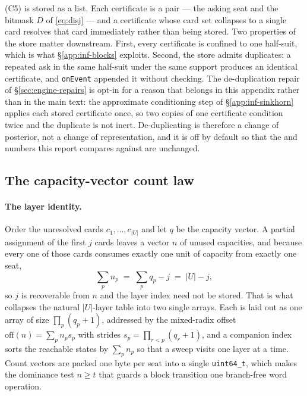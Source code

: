 (C5) is stored as a list. Each certificate is a pair --- the asking seat and the
bitmask $D$ of \eqref{eq:disj} --- and a certificate whose card set collapses to
a single card resolves that card immediately rather than being stored. Two
properties of the store matter downstream. First, every certificate is confined
to one half-suit, which is what \S\ref{app:inf-blocks} exploits. Second, the
store admits duplicates: a repeated ask in the same half-suit under the same
support produces an identical certificate, and \texttt{onEvent} appended it
without checking. The de-duplication repair of \S\ref{sec:engine-repairs} is
opt-in for a reason that belongs in this appendix rather than in the main text:
the approximate conditioning step of \S\ref{app:inf-sinkhorn} applies each stored
certificate once, so two copies of one certificate condition twice and the
duplicate is not inert. De-duplicating is therefore a change of posterior, not a
change of representation, and it is off by default so that the \vfour{} and
\vfive{} numbers this report compares against are unchanged.

\subsection{The capacity-vector count law}
\label{app:inf-count}

\paragraph{The layer identity.} Order the unresolved cards $c_1,\dots,c_{|U|}$
and let $q$ be the capacity vector. A partial assignment of the first $j$ cards
leaves a vector $n$ of unused capacities, and because every one of those cards
consumes exactly one unit of capacity from exactly one seat,
\[
  \sum_p n_p \;=\; \sum_p q_p - j \;=\; |U| - j ,
\]
so $j$ is recoverable from $n$ and the layer index need not be stored. That is
what collapses the natural $|U|$-layer table into two single arrays. Each is laid
out as one array of size $\prod_p (q_p+1)$, addressed by the mixed-radix offset
$\mathrm{off}(n) = \sum_p n_p s_p$ with strides $s_p = \prod_{r<p}(q_r+1)$, and a
companion index sorts the reachable states by $\sum_p n_p$ so that a sweep visits
one layer at a time. Count vectors are packed one byte per seat into a single
\verb|uint64_t|, which makes the dominance test $n \ge t$ that guards a block
transition one branch-free word operation.

